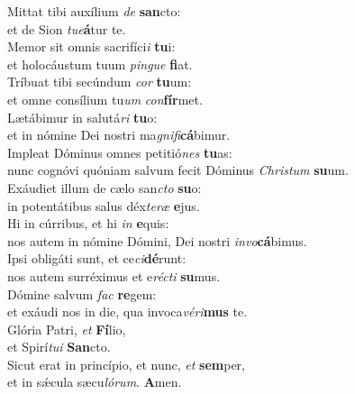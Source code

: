 \evenverse Mittat tibi auxílium \textit{de} \textbf{san}cto:~\*\\
\evenverse et de Sion \textit{tu}\textit{e}\textbf{á}tur te.\\
\oddverse Memor sit omnis sacrifíci\textit{i} \textbf{tu}i:~\*\\
\oddverse et holocáustum tuum \textit{pin}\textit{gue} \textbf{fi}at.\\
\evenverse Tríbuat tibi secúndum \textit{cor} \textbf{tu}um:~\*\\
\evenverse et omne consílium tu\textit{um} \textit{con}\textbf{fír}met.\\
\oddverse Lætábimur in salutá\textit{ri} \textbf{tu}o:~\*\\
\oddverse et in nómine Dei nostri ma\textit{gni}\textit{fi}\textbf{cá}bimur.\\
\evenverse Impleat Dóminus omnes petitió\textit{nes} \textbf{tu}as:~\*\\
\evenverse nunc cognóvi quóniam salvum fecit Dóminus \textit{Chri}\textit{stum} \textbf{su}um.\\
\oddverse Exáudiet illum de cælo san\textit{cto} \textbf{su}o:~\*\\
\oddverse in potentátibus salus déx\textit{te}\textit{ræ} \textbf{e}jus.\\
\evenverse Hi in cúrribus, et hi \textit{in} \textbf{e}quis:~\*\\
\evenverse nos autem in nómine Dómini, Dei nostri \textit{in}\textit{vo}\textbf{cá}bimus.\\
\oddverse Ipsi obligáti sunt, et ce\textit{ci}\textbf{dé}runt:~\*\\
\oddverse nos autem surréximus et e\textit{ré}\textit{cti} \textbf{su}mus.\\
\evenverse Dómine salvum \textit{fac} \textbf{re}gem:~\*\\
\evenverse et exáudi nos in die, qua invoca\textit{vé}\textit{ri}\textbf{mus} te.\\
\oddverse Glória Patri, \textit{et} \textbf{Fí}lio,~\*\\
\oddverse et Spirí\textit{tu}\textit{i} \textbf{San}cto.\\
\evenverse Sicut erat in princípio, et nunc, \textit{et} \textbf{sem}per,~\*\\
\evenverse et in sǽcula sæcu\textit{ló}\textit{rum}. \textbf{A}men.\\
